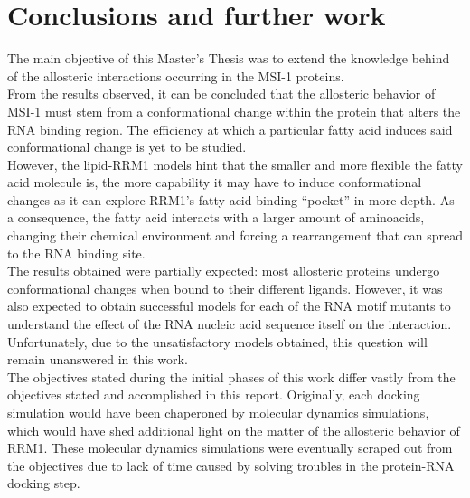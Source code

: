 \section{Conclusions and further work}

The main objective of this Master's Thesis was to extend the knowledge behind of the allosteric interactions occurring in the MSI-1 proteins.\\

From the results observed, it can be concluded that the allosteric behavior of MSI-1 must stem from a conformational change within the protein that alters the RNA binding region. The efficiency at which a particular fatty acid induces said conformational change is yet to be studied.\\

However, the lipid-RRM1 models hint that the smaller and more flexible the fatty acid molecule is, the more capability it may have to induce conformational changes as it can explore RRM1's fatty acid binding ``pocket'' in more depth. As a consequence, the fatty acid interacts with a larger amount of aminoacids, changing their chemical environment and forcing a rearrangement that can spread to the RNA binding site.\\

The results obtained were partially expected: most allosteric proteins undergo conformational changes when bound to their different ligands. However, it was also expected to obtain successful models for each of the RNA motif mutants to understand the effect of the RNA nucleic acid sequence itself on the interaction. Unfortunately, due to the unsatisfactory models obtained, this question will remain unanswered in this work.\\

The objectives stated during the initial phases of this work differ vastly from the objectives stated and accomplished in this report. Originally, each docking simulation would have been chaperoned by molecular dynamics simulations, which would have shed additional light on the matter of the allosteric behavior of RRM1. These molecular dynamics simulations were eventually scraped out from the objectives due to lack of time caused by solving troubles in the protein-RNA docking step.\\


